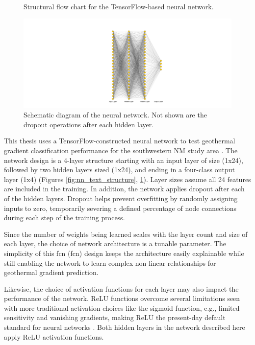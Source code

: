 \begin{figure}[!htp]
\begin{minipage}[b][][b]{.35\linewidth}
    \caption[Neural network structural flow]{Structural flow chart for the TensorFlow-based neural network.}
    \label{fig:nn_text_structure}
\end{minipage}
\hfill
\begin{minipage}[b][][b]{.61\linewidth}
    \includegraphics[width=\linewidth]{templates/images/Figure-ANN.pdf}
    \caption[Neural network structural schematic]{Schematic diagram of the neural network. Not shown are the dropout operations after each hidden layer.}
    \label{fig:nn_dot_structure}
\end{minipage}
\end{figure}

This thesis uses a TensorFlow-constructed neural network to test geothermal gradient classification performance for the southwestern NM study area \citep{abadi_tensorflow_2016}. The network design is a 4-layer structure starting with an input layer of size (1x24), followed by two hidden layers sized (1x24), and ending in a four-class output layer (1x4) (Figures \ref{fig:nn_text_structure}, \ref{fig:nn_dot_structure}). Layer sizes assume all 24 features are included in the training. In addition, the network applies dropout after each of the hidden layers. Dropout helps prevent overfitting by randomly assigning inputs to zero, temporarily severing a defined percentage of node connections during each step of the training process.

Since the number of weights being learned scales with the layer count and size of each layer, the choice of network architecture is a tunable parameter. The simplicity of this \acrlong{fcn} (\acrshort{fcn}) design keeps the architecture easily explainable while still enabling the network to learn complex non-linear relationships for geothermal gradient prediction.

Likewise, the choice of activation functions for each layer may also impact the performance of the network. ReLU functions overcome several limitations seen with more traditional activation choices like the sigmoid function, e.g., limited sensitivity and vanishing gradients, making ReLU the present-day default standard for neural networks \citep{brownlee_gentle_2019}. Both hidden layers in the network described here apply ReLU activation functions.

